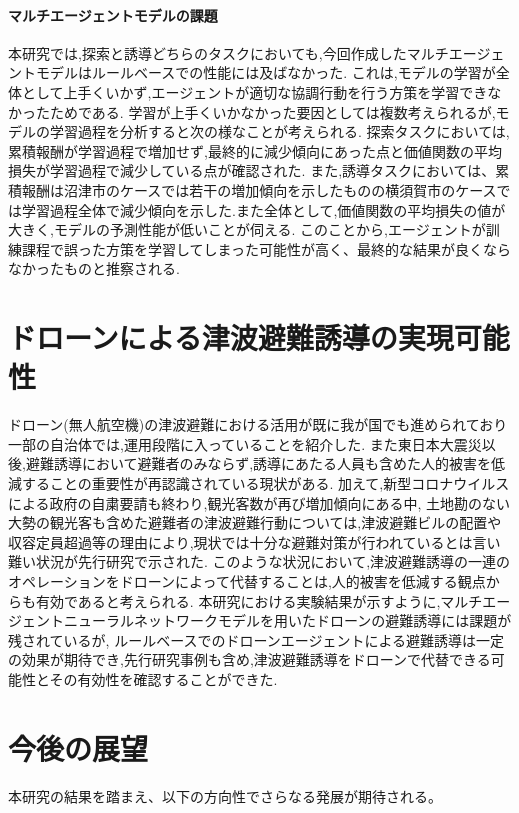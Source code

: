 \paragraph{マルチエージェントモデルの課題}
本研究では,探索と誘導どちらのタスクにおいても,今回作成したマルチエージェントモデルはルールベースでの性能には及ばなかった.
これは,モデルの学習が全体として上手くいかず,エージェントが適切な協調行動を行う方策を学習できなかったためである.
学習が上手くいかなかった要因としては複数考えられるが,モデルの学習過程を分析すると次の様なことが考えられる.
探索タスクにおいては,累積報酬が学習過程で増加せず,最終的に減少傾向にあった点と価値関数の平均損失が学習過程で減少している点が確認された.
また,誘導タスクにおいては、累積報酬は沼津市のケースでは若干の増加傾向を示したものの横須賀市のケースでは学習過程全体で減少傾向を示した.また全体として,価値関数の平均損失の値が大きく,モデルの予測性能が低いことが伺える.
このことから,エージェントが訓練課程で誤った方策を学習してしまった可能性が高く、最終的な結果が良くならなかったものと推察される.

\section{ドローンによる津波避難誘導の実現可能性}
ドローン(無人航空機)の津波避難における活用が既に我が国でも進められており一部の自治体では,運用段階に入っていることを紹介した.
また東日本大震災以後,避難誘導において避難者のみならず,誘導にあたる人員も含めた人的被害を低減することの重要性が再認識されている現状がある.
加えて,新型コロナウイルスによる政府の自粛要請も終わり,観光客数が再び増加傾向にある中,
土地勘のない大勢の観光客も含めた避難者の津波避難行動については,津波避難ビルの配置や収容定員超過等の理由により,現状では十分な避難対策が行われているとは言い難い状況が先行研究で示された.
このような状況において,津波避難誘導の一連のオペレーションをドローンによって代替することは,人的被害を低減する観点からも有効であると考えられる.
本研究における実験結果が示すように,マルチエージェントニューラルネットワークモデルを用いたドローンの避難誘導には課題が残されているが,
ルールベースでのドローンエージェントによる避難誘導は一定の効果が期待でき,先行研究事例も含め,津波避難誘導をドローンで代替できる可能性とその有効性を確認することができた.
\section{今後の展望}
本研究の結果を踏まえ、以下の方向性でさらなる発展が期待される。

